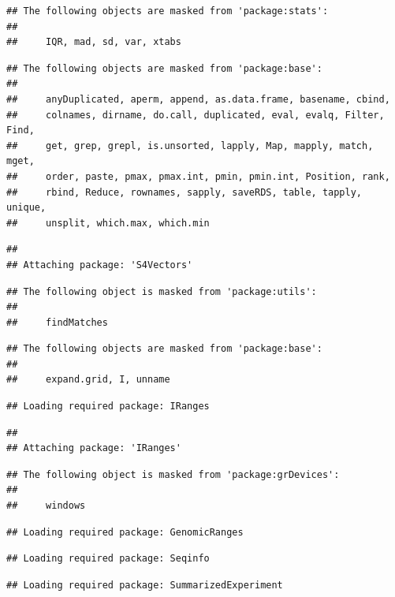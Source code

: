 \documentclass[
]{article}
\begin{document}
\begin{verbatim}
## The following objects are masked from 'package:stats':
## 
##     IQR, mad, sd, var, xtabs
\end{verbatim}

\begin{verbatim}
## The following objects are masked from 'package:base':
## 
##     anyDuplicated, aperm, append, as.data.frame, basename, cbind,
##     colnames, dirname, do.call, duplicated, eval, evalq, Filter, Find,
##     get, grep, grepl, is.unsorted, lapply, Map, mapply, match, mget,
##     order, paste, pmax, pmax.int, pmin, pmin.int, Position, rank,
##     rbind, Reduce, rownames, sapply, saveRDS, table, tapply, unique,
##     unsplit, which.max, which.min
\end{verbatim}

\begin{verbatim}
## 
## Attaching package: 'S4Vectors'
\end{verbatim}

\begin{verbatim}
## The following object is masked from 'package:utils':
## 
##     findMatches
\end{verbatim}

\begin{verbatim}
## The following objects are masked from 'package:base':
## 
##     expand.grid, I, unname
\end{verbatim}

\begin{verbatim}
## Loading required package: IRanges
\end{verbatim}

\begin{verbatim}
## 
## Attaching package: 'IRanges'
\end{verbatim}

\begin{verbatim}
## The following object is masked from 'package:grDevices':
## 
##     windows
\end{verbatim}

\begin{verbatim}
## Loading required package: GenomicRanges
\end{verbatim}

\begin{verbatim}
## Loading required package: Seqinfo
\end{verbatim}

\begin{verbatim}
## Loading required package: SummarizedExperiment
\end{verbatim}
\end{document}
